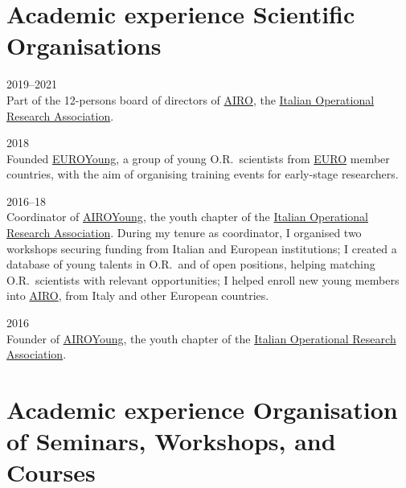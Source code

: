 \section*{Academic experience {\small Scientific Organisations}}

\begin{paracol}{2}
  \textsc{2019--2021}
\switchcolumn
  \\
  Part of the 12-persons board of directors of \href{https://www.airo.org/}{AIRO}, the \href{https://www.airo.org/}{Italian Operational Research Association}.
\end{paracol}

\begin{paracol}{2}
  \textsc{2018}
\switchcolumn
  \\
  Founded \href{https://euroyoung.github.io/}{EUROYoung}, a group of young O.R.\ scientists from \href{https://www.euro-online.org}{EURO} member countries, with the aim of organising training events for early-stage researchers.
\end{paracol}

\begin{paracol}{2}
  \textsc{2016--18}
\switchcolumn
  \\
  Coordinator of \href{https://www.airoyoung.org/}{AIROYoung}, the youth chapter of the \href{http://www.airo.org}{Italian Operational Research Association}.
  During my tenure as coordinator, I organised two workshops securing funding from Italian and European institutions;
  I created a database of young talents in O.R.\ and of open positions, helping matching O.R.\ scientists with relevant opportunities;
  I helped enroll new young members into \href{https://www.airo.org/}{AIRO}, from Italy and other European countries.
\end{paracol}

\begin{paracol}{2}
  \textsc{2016}
\switchcolumn
  \\
  Founder of \href{https://www.airoyoung.org}{AIROYoung}, the youth chapter of the \href{http://www.airo.org}{Italian Operational Research Association}.
\end{paracol}

\section*{Academic experience {\small Organisation of Seminars, Workshops, and Courses}}


